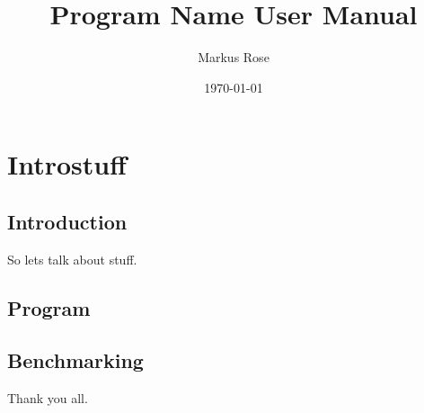\documentclass{scrreprt}
\author{Markus Rose}
\title{Program Name User Manual}
\date{\today}
\begin{document}
\maketitle

\tableofcontents

\chapter{Introstuff}

\section{Introduction}

So lets talk about stuff.

\section{Program}

\section{Benchmarking}

Thank you all.
\end{document}
